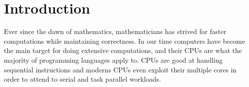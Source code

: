\chapter{Introduction} %
\label{cha:introduction}
Ever since the dawn of mathematics, mathematicians has strived for faster computations while maintaining correctness.
In our time computers have become the main target for doing extensive computations, and their CPUs are what the majority of programming languages apply to.
CPUs are good at handling sequential instructions and moderns CPUs even exploit their multiple cores in order to attend to serial and task parallel workloads.

   








